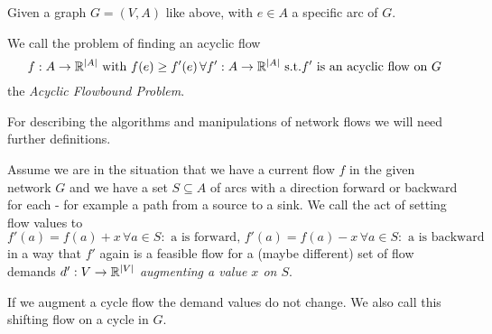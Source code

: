 \begin{definition}
  Given a graph $G=(V,A)$ like above, with $e \in A$ a specific arc of $G$. 
  
We call the problem of finding an acyclic flow 
$$f:A\to\mathbb{R}^{|A|}\textrm{ with }f(e)\ge f'(e)\,\forall f':A\to\mathbb{R}^{|A|}\textrm{ s.t.} f'\textrm{ is an acyclic flow on 
}G$$
  the \textit{ Acyclic Flowbound Problem}.
\end{definition}

For describing the algorithms and manipulations of network flows we will need further definitions. 
\begin{definition}
 Assume we are in the situation that we  have a current flow $f$ in the given network $G$ and we have a set 
$S\subseteq A$ of arcs with a direction forward or backward for each - for example a path from a source to a sink. We 
call the act of setting flow values to
$$f'(a)= f(a)+x \,\forall a\in S:\textrm{ a is forward, }f'(a)= f(a)-x \,\forall a\in S:\textrm{ a is backward}$$
in a way that $f'$ again is a feasible flow for a (maybe different) set of flow demands $d':V\to\mathbb{R}^{|V|}$ 
\textit{ augmenting a value $x$ on $S$}. 

If we augment a cycle flow the demand values do not change. We also call this shifting flow on a cycle in $G$.

\end{definition}


